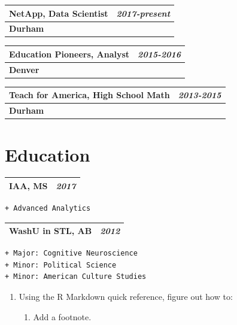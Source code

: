 \documentclass[]{book}
\providecommand{\tightlist}{%
  \setlength{\itemsep}{0pt}\setlength{\parskip}{0pt}}
\theoremstyle{definition}
\theoremstyle{definition}
\theoremstyle{definition}
\theoremstyle{remark}
\begin{document}
\begin{longtable}[]{@{}ll@{}}
\toprule
NetApp, Data Scientist & \emph{2017-present}\tabularnewline
\midrule
\endhead
\textbf{Durham} &\tabularnewline
\bottomrule
\end{longtable}

\begin{longtable}[]{@{}ll@{}}
\toprule
Education Pioneers, Analyst & \emph{2015-2016}\tabularnewline
\midrule
\endhead
\textbf{Denver} &\tabularnewline
\bottomrule
\end{longtable}

\begin{longtable}[]{@{}ll@{}}
\toprule
Teach for America, High School Math & \emph{2013-2015}\tabularnewline
\midrule
\endhead
\textbf{Durham} &\tabularnewline
\bottomrule
\end{longtable}

\hypertarget{education}{%
\section{Education}\label{education}}

\begin{longtable}[]{@{}ll@{}}
\toprule
IAA, MS & \emph{2017}\tabularnewline
\midrule
\endhead
\bottomrule
\end{longtable}

\begin{verbatim}
+ Advanced Analytics
\end{verbatim}

\begin{longtable}[]{@{}ll@{}}
\toprule
WashU in STL, AB & \emph{2012}\tabularnewline
\midrule
\endhead
\bottomrule
\end{longtable}

\begin{verbatim}
+ Major: Cognitive Neuroscience
+ Minor: Political Science
+ Minor: American Culture Studies
\end{verbatim}

\begin{enumerate}
\def\labelenumi{\arabic{enumi}.}
\setcounter{enumi}{1}
\item
  Using the R Markdown quick reference, figure out how to:

  \begin{enumerate}
  \def\labelenumii{\arabic{enumii}.}
  \tightlist
  \item
    Add a footnote.
  \end{enumerate}
\end{enumerate}
\end{document}
